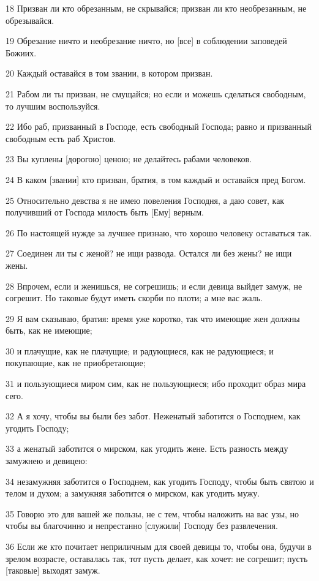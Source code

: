 \par 18 Призван ли кто обрезанным, не скрывайся; призван ли кто необрезанным, не обрезывайся.
\par 19 Обрезание ничто и необрезание ничто, но [все] в соблюдении заповедей Божиих.
\par 20 Каждый оставайся в том звании, в котором призван.
\par 21 Рабом ли ты призван, не смущайся; но если и можешь сделаться свободным, то лучшим воспользуйся.
\par 22 Ибо раб, призванный в Господе, есть свободный Господа; равно и призванный свободным есть раб Христов.
\par 23 Вы куплены [дорогою] ценою; не делайтесь рабами человеков.
\par 24 В каком [звании] кто призван, братия, в том каждый и оставайся пред Богом.
\par 25 Относительно девства я не имею повеления Господня, а даю совет, как получивший от Господа милость быть [Ему] верным.
\par 26 По настоящей нужде за лучшее признаю, что хорошо человеку оставаться так.
\par 27 Соединен ли ты с женой? не ищи развода. Остался ли без жены? не ищи жены.
\par 28 Впрочем, если и женишься, не согрешишь; и если девица выйдет замуж, не согрешит. Но таковые будут иметь скорби по плоти; а мне вас жаль.
\par 29 Я вам сказываю, братия: время уже коротко, так что имеющие жен должны быть, как не имеющие;
\par 30 и плачущие, как не плачущие; и радующиеся, как не радующиеся; и покупающие, как не приобретающие;
\par 31 и пользующиеся миром сим, как не пользующиеся; ибо проходит образ мира сего.
\par 32 А я хочу, чтобы вы были без забот. Неженатый заботится о Господнем, как угодить Господу;
\par 33 а женатый заботится о мирском, как угодить жене. Есть разность между замужнею и девицею:
\par 34 незамужняя заботится о Господнем, как угодить Господу, чтобы быть святою и телом и духом; а замужняя заботится о мирском, как угодить мужу.
\par 35 Говорю это для вашей же пользы, не с тем, чтобы наложить на вас узы, но чтобы вы благочинно и непрестанно [служили] Господу без развлечения.
\par 36 Если же кто почитает неприличным для своей девицы то, чтобы она, будучи в зрелом возрасте, оставалась так, тот пусть делает, как хочет: не согрешит; пусть [таковые] выходят замуж.
